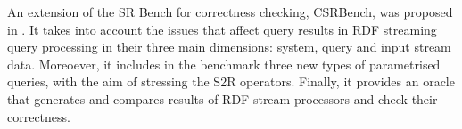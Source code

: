 An extension of the SR Bench for correctness checking, CSRBench, was proposed in \cite{DBLP:conf/semweb/DellAglioCBCV13}. It takes into account the issues that affect query results in RDF streaming query processing in their three main dimensions: system, query and input stream data. Moreoever, it includes in the benchmark three new types of parametrised queries, with the aim of stressing the S2R operators. Finally, it provides an oracle that generates and compares results of RDF stream processors and check their correctness.